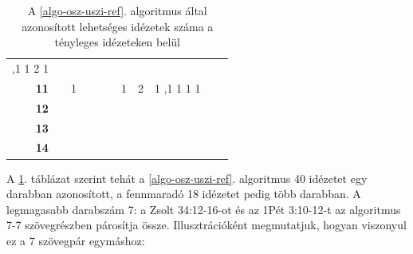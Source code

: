 \documentclass{article}
\begin{document}
\begin{table}
\begin{tabular}{r|cccccccccc}
,1%
1%
2%
1%
\\
{\bf 11}&&
1%
&&&&
1%
&
2%
&
1%
,1%
1%
1%
1%
&&\\
{\bf 12}&&&&&&&&&&\\
{\bf 13}&&&&&&&&&&\\
{\bf 14}&&&&&&&&&&\\
\end{tabular}
\caption{A \ref{algo-osz-uszi-ref}. algoritmus által azonosított lehetséges idézetek száma
a tényleges idézeteken belül}
\label{darabszam}
\end{table}

A \ref{darabszam}. táblázat szerint tehát a \ref{algo-osz-uszi-ref}. algoritmus
40 idézetet egy darabban azonosított, a fennmaradó 18 idézetet pedig több darabban.
A legmagasabb darabszám 7: a Zsolt 34:12-16-ot és az 1Pét 3:10-12-t az algoritmus 7-7 szövegrészben
párosítja össze. Illusztrációként megmutatjuk, hogyan viszonyul ez a 7 szövegpár egymáshoz:
\end{document}
